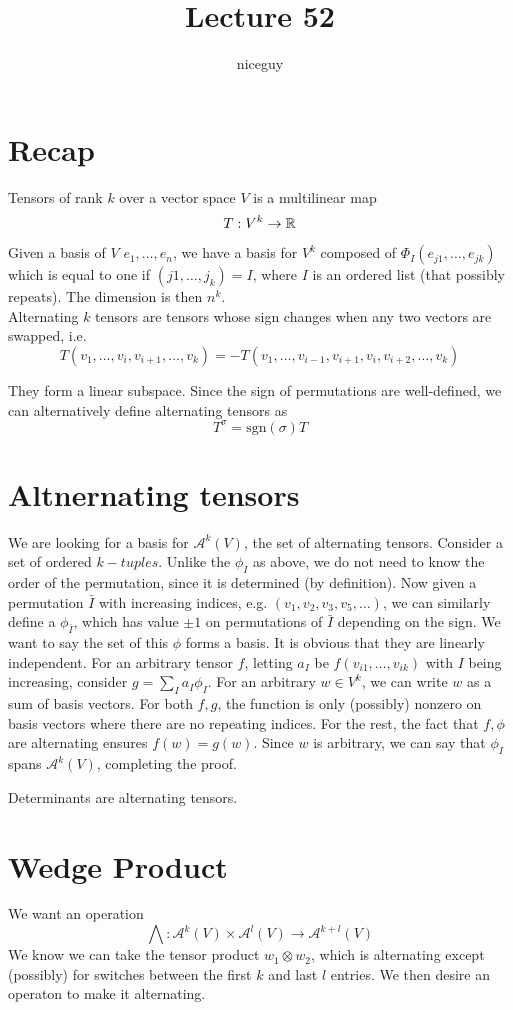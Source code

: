 \documentclass[12pt]{article}
\title{Lecture 52}
\author{niceguy}
\begin{document}
\maketitle

\section{Recap}

Tensors of rank $k$ over a vector space $V$ is a multilinear map
$$T:V^k \rightarrow \mathbb{R}$$

Given a basis of $V$ $e_1,\dots,e_n$, we have a basis for $V^k$ composed of $\Phi_I(e_{j1},\dots,e_{jk})$ which is equal to one if $(j1,\dots,j_k) = I$, where $I$ is an ordered list (that possibly repeats). The dimension is then $n^k$. \\

Alternating $k$ tensors are tensors whose sign changes when any two vectors are swapped, i.e.
$$T(v_1,\dots,v_i,v_{i+1},\dots,v_k) = -T(v_1,\dots,v_{i-1},v_{i+1},v_i,v_{i+2},\dots,v_k)$$

They form a linear subspace. Since the sign of permutations are well-defined, we can alternatively define alternating tensors as
$$T^\sigma = \text{sgn}(\sigma)T$$

\section{Altnernating tensors}

We are looking for a basis for $\mathcal A^k(V)$, the set of alternating tensors. Consider a set of ordered $k-tuples$. Unlike the $\phi_I$ as above, we do not need to know the order of the permutation, since it is determined (by definition). Now given a permutation $\bar I$ with increasing indices, e.g. $(v_1,v_2,v_3,v_5,\dots)$, we can similarly define a $\phi_{\bar I}$, which has value $\pm1$ on permutations of $\bar I$ depending on the sign. We want to say the set of this $\phi$ forms a basis. It is obvious that they are linearly independent. For an arbitrary tensor $f$, letting $a_I$ be $f(v_{i1},\dots,v_{ik})$ with $I$ being increasing, consider $g = \sum_I a_I\phi_I$. For an arbitrary $w \in V^k$, we can write $w$ as a sum of basis vectors. For both $f,g$, the function is only (possibly) nonzero on basis vectors where there are no repeating indices. For the rest, the fact that $f,\phi$ are alternating ensures $f(w) = g(w)$. Since $w$ is arbitrary, we can say that $\phi_I$ spans $\mathcal A^k(V)$, completing the proof.

\begin{ex}
    Determinants are alternating tensors.
\end{ex}

\section{Wedge Product}

We want an operation
$$\bigwedge:\mathcal A^k(V) \times \mathcal A^l(V) \rightarrow \mathcal A^{k+l}(V)$$
We know we can take the tensor product $w_1 \otimes w_2$, which is alternating except (possibly) for switches between the first $k$ and last $l$ entries. We then desire an operaton to make it alternating.
\end{document}
